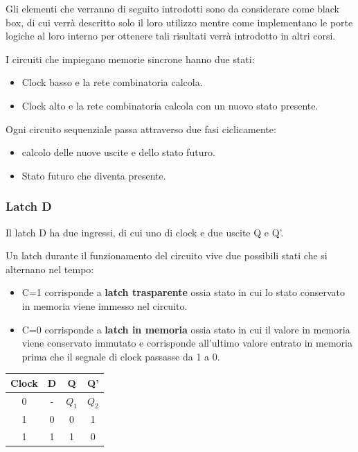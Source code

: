 \documentclass[a4paper]{book}
\begin{document}
Gli elementi che verranno di seguito introdotti sono da considerare come black box, di cui verrà descritto solo il loro utilizzo mentre come implementano le porte logiche al loro interno per ottenere tali risultati verrà introdotto in altri corsi.

I circuiti che impiegano memorie sincrone hanno due stati:

\begin{itemize}
\item Clock basso e la rete combinatoria calcola.
\item Clock alto e la rete combinatoria calcola con un nuovo stato presente.
\end{itemize}




Ogni circuito sequenziale passa attraverso due fasi ciclicamente:
\begin{itemize}
\item{} calcolo delle nuove uscite e dello stato futuro.
\item{} Stato futuro che diventa presente.
\end{itemize}


\subsubsection{Latch D}

Il latch D ha due ingressi, di cui uno di clock e due uscite Q e Q'.

Un latch durante il funzionamento del circuito vive due possibili stati che si alternano nel tempo:

\begin{itemize}
\item C=1 corrisponde a \textbf{latch trasparente} ossia stato in cui lo stato conservato in memoria viene immesso nel circuito.
\item C=0 corrisponde a \textbf{latch in memoria} ossia stato in cui il valore in memoria viene conservato immutato e corrisponde all'ultimo valore entrato in memoria prima che il segnale di clock passasse da 1 a 0.
\end{itemize}	


\begin{tabular}{|c|c|c|c|}
\hline
Clock & D & Q   & Q' \\
\hline
0     & - & \(Q_1\) & \(Q_2\)\\
\hline
1     & 0 & 0   & 1  \\
\hline
1     & 1 & 1   & 0  \\
\hline
\end{tabular}
\end{document}

